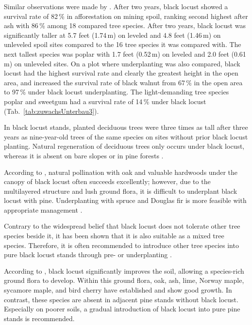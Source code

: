 
Similar observations were made by \citet{limstrom1951schuttaufforstung}. After two years, black locust showed a survival rate of 82\,\% in afforestation on mining spoil, ranking second highest after ash with 86\,\% among 18 compared tree species. After two years, black locust was significantly taller at 5.7 feet (1.74\,m) on leveled and 4.8 feet (1.46\,m) on unleveled spoil sites compared to the 16 tree species it was compared with. The next tallest species was poplar with 1.7 feet (0.52\,m) on leveled and 2.0 feet (0.61\,m) on unleveled sites. On a plot where underplanting was also compared, black locust had the highest survival rate and clearly the greatest height in the open area, and increased the survival rate of black walnut from 67\,\% in the open area to 97\,\% under black locust underplanting. The light-demanding tree species poplar and sweetgum had a survival rate of 14\,\% under black locust (Tab.~\ref{tab:zuwachsUnterbau3}).


In black locust stands, planted deciduous trees were three times as tall after three years as nine-year-old trees of the same species on sites without prior black locust planting. Natural regeneration of deciduous trees only occurs under black locust, whereas it is absent on bare slopes or in pine forests \citep{chapman1947robinie}.

According to \citet[p.~19]{erteld1952robinieErtrag}, natural pollination with oak and valuable hardwoods under the canopy of black locust often succeeds excellently; however, due to the multilayered structure and lush ground flora, it is difficult to underplant black locust with pine. Underplanting with spruce and Douglas fir is more feasible with appropriate management \citep[p.~94]{erteld1952robinieErtrag}.

Contrary to the widespread belief that black locust does not tolerate other tree species beside it, it has been shown that it is also suitable as a mixed tree species. Therefore, it is often recommended to introduce other tree species into pure black locust stands through pre- or underplanting \citep{ewald2001klone}.

According to \citet[pp.~90--92]{erteld1952robinieErtrag}, black locust significantly improves the soil, allowing a species-rich ground flora to develop. Within this ground flora, oak, ash, lime, Norway maple, sycamore maple, and bird cherry have established and show good growth. In contrast, these species are absent in adjacent pine stands without black locust. Especially on poorer soils, a gradual introduction of black locust into pure pine stands is recommended.

